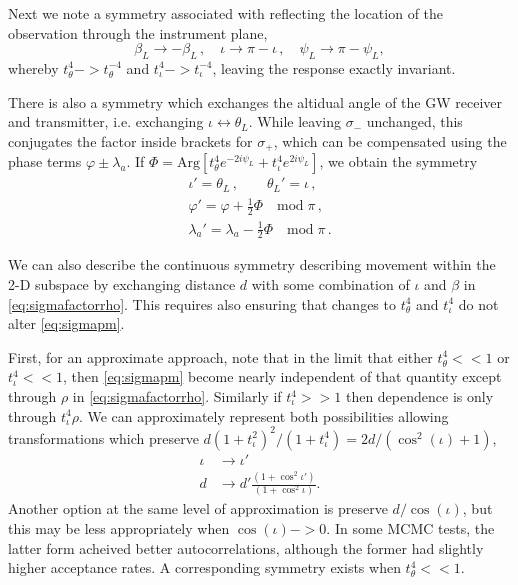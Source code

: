 \documentclass[aps,showpacs,twocolumn,prd,superscriptaddress,nofootinbib]{revtex4}
\newcommand{\be}{\begin{equation}}
\newcommand{\ee}{\end{equation}}
\newcommand{\nn}{\nonumber}
\newcommand\betaL{{\beta_{L}}}
\newcommand\psiL{{\psi_{L}}}
\begin{document}
Next we note a symmetry associated with reflecting the location of the observation through the instrument plane, 
\be\label{eq:symmetryresponse}
\betaL \rightarrow -\betaL\,, \quad \iota \rightarrow \pi - \iota \,, \quad \psiL \rightarrow \pi - \psiL,
\ee
whereby  $t^4_{\theta}->t^{-4}_{\theta}$ and $t^4_{\iota}->t^{-4}_{\iota}$,
leaving the response exactly invariant.

There is also a symmetry which exchanges the altidual angle of the GW receiver and transmitter, i.e. exchanging $\iota \leftrightarrow \theta_{L}$. While leaving $\sigma_-$ unchanged, this conjugates the factor inside brackets for $\sigma_{+}$, which can be compensated using the phase terms $\varphi \pm \lambda_{a}$. If $\Phi = \mathrm{Arg} \left[ t_{\theta}^{4} e^{-2 i \psiL} + t_{\iota}^{4} e^{2 i \psiL} \right]$, we obtain the symmetry
\begin{align}
	\iota' = \theta_{L} \,, \qquad \theta_{L}' = \iota \,, \nn\\
	\varphi' = \varphi + \frac{1}{2} \Phi \quad \mathrm{mod} \; \pi\,, \nn\\
	\lambda_{a}' = \lambda_{a} - \frac{1}{2} \Phi \quad \mathrm{mod} \; \pi\,.
\end{align}

We can also describe the continuous symmetry describing movement within the 2-D subspace by exchanging distance $d$ with some combination of $\iota$ and $\beta$ in  \eqref{eq:sigmafactorrho}.  This requires also ensuring that changes to $t^4_{\theta}$ and $t^4_{\iota}$ do not alter \eqref{eq:sigmapm}.

First, for an approximate approach, note that in the limit that either $t^4_\theta<<1$ or $t^4_\iota<<1$, then \eqref{eq:sigmapm} become nearly independent of that quantity except through  $\rho$ in \eqref{eq:sigmafactorrho}. Similarly if $t^4_\iota>>1$ then dependence is only through $t^4_\iota\rho$. We can approximately represent both possibilities allowing transformations which preserve $d(1+t^2_\iota)^2/(1+t^4_\iota)=2d/(\cos^2(\iota)+1)$,
\begin{align}
  \iota&\rightarrow\iota'\\
  d&\rightarrow d'\frac{(1+\cos^2{\iota'})}{(1+\cos^2{\iota})}.
\end{align}
Another option at the same level of approximation is preserve $d/\cos(\iota)$, but this may be less appropriately when $\cos(\iota)->0$.  In some MCMC tests, the latter form acheived better autocorrelations, although the former had slightly higher acceptance rates. A corresponding symmetry exists when $t^4_\theta<<1$.  
\end{document}
